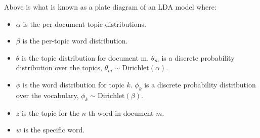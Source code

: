 \documentclass{article}
\begin{document}
Above is what is known as a plate diagram of an LDA model where:
\begin{itemize}
\item $\alpha$ is the per-document topic distributions.
\item $\beta$ is the per-topic word distribution.
\item $\theta$ is the topic distribution for document m. $\theta_m$ is a discrete probability distribution over the topics, $\theta_m \sim \text{Dirichlet}(\alpha)$.
\item $\phi$ is the word distribution for topic $k$. $\phi_k$ is a discrete probability distribution over the vocabulary, $\phi_k \sim \text{Dirichlet}(\beta)$.
\item $z$ is the topic for the $n$-th word in document $m$.
\item $w$ is the specific word.
\end{itemize}
\end{document}
